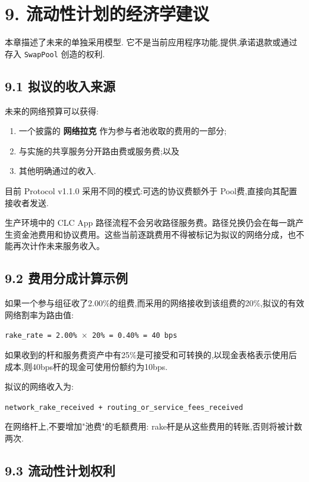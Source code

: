 \documentclass[11pt]{article}
\begin{document}
\section*{9. 流动性计划的经济学建议}

本章描述了未来的单独采用模型. 它不是当前应用程序功能,提供,承诺退款或通过存入 \texttt{SwapPool} 创造的权利.

\subsection*{9.1 拟议的收入来源}

未来的网络预算可以获得:

\begin{enumerate}[leftmargin=*]
\item 一个披露的 \textbf{网络拉克} 作为参与者池收取的费用的一部分;
\item 与实施的共享服务分开路由费或服务费;以及
\item 其他明确通过的收入.
\end{enumerate}
目前 Protocol v1.1.0 采用不同的模式:可选的协议费额外于 Pool费,直接向其配置接收者发送.

生产环境中的 CLC App 路径流程不会另收路径服务费。路径兑换仍会在每一跳产生资金池费用和协议费用。这些当前逐跳费用不得被标记为拟议的网络分成，也不能再次计作未来服务收入。

\subsection*{9.2 费用分成计算示例}

如果一个参与组征收了2.00\%的组费,而采用的网络接收到该组费的20\%,拟议的有效网络割率为路由值:

\texttt{rake\_rate = 2.00\% $\times$ 20\% = 0.40\% = 40 bps}

如果收到的杆和服务费资产中有25\%是可接受和可转换的,以现金表格表示使用后成本,则40bps杆的现金可使用份额约为10bps.

拟议的网络收入为:

\texttt{network\_rake\_received + routing\_or\_service\_fees\_received}

在网络杆上,不要增加"池费"的毛额费用: rake杆是从这些费用的转账,否则将被计数两次.

\subsection*{9.3 流动性计划权利}
\end{document}

